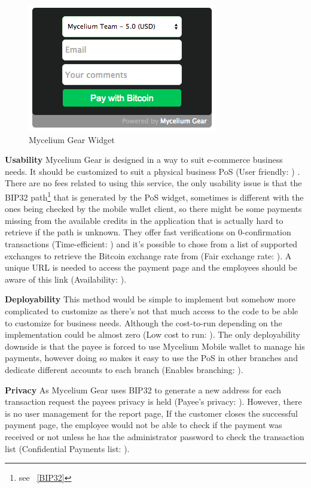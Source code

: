 \begin{figure}[htb!p]
\centering
\includegraphics[scale=0.5]{fig/Mycelium_gear.png}
  \caption{Mycelium Gear Widget}
\label{fig:mycelium-widget}
\end{figure}


\textbf{Usability}
Mycelium Gear is designed in a way to suit e-commerce business needs. It should be customized to suit a physical business PoS (User friendly: \prt) . There are no fees related to using this service, the only usability issue is that the BIP32 path\footnote{see ~\ref{BIP32}} that is generated by the PoS widget, sometimes is different with the ones being checked by the mobile wallet client, so there might be some payments missing from the available credits in the application that is actually hard to retrieve if the path is unknown. They offer fast verifications on 0-confirmation transactions (Time-efficient: \full) and it's possible to chose from a list of supported exchanges to retrieve the Bitcoin exchange rate from (Fair exchange rate: \prt). A unique URL is needed to access the payment page and the employees should be aware of this link (Availability: \prt).

\textbf{Deployability}
This method would be simple to implement but somehow more complicated to customize as there's not that much access to the code to be able to customize for business needs. Although the cost-to-run depending on the implementation could be almost zero (Low cost to run: \prt). The only deployability downside is that the payee is forced to use Mycelium Mobile wallet to manage his payments, however doing so makes it easy to use the PoS in other branches and dedicate different accounts to each branch (Enables branching: \full).

 \textbf{Privacy}
As Mycelium Gear uses BIP32 to generate a new address for each transaction request the payees privacy is held (Payee's privacy: \full). However, there is no user management for the report page, If the customer closes the successful payment page, the employee would not be able to check if the payment was received or not unless he has the administrator password to check the transaction list (Confidential Payments list: \prt).


